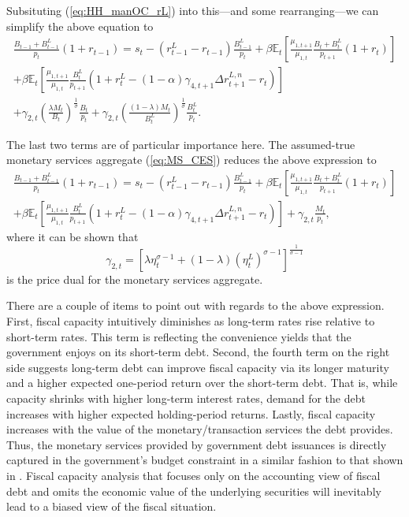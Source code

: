 \documentclass[11pt,a4paper,margin=1.5in]{article}
\begin{document}
Subsituting (\ref{eq:HH_manOC_rL}) into this---and some rearranging---we can simplify the above equation to
\begin{multline}
	\frac{B_{t-1} + B^L_{t-1}}{p_t}(1+r_{t-1})= s_t - (r_{t-1}^L - r_{t-1})\frac{B^L_{t-1}}{p_t} + \beta\mathbb{E}_t\left[\frac{\mu_{1,t+1}}{\mu_{1,t}} \frac{B_{t} +B^L_{t}}{p_{t+1}}(1+r_{t})\right] \\ 
		+ \beta\mathbb{E}_t\left[\frac{\mu_{1,t+1}}{\mu_{1,t}} \frac{B^L_{t}}{p_{t+1}}(1+r^L_{t} - (1-\alpha)\gamma_{4,t+1}\Delta r^{L,n}_{t+1} - r_t)\right]  \\
		+  \gamma_{2,t}\left(\frac{\lambda M_t}{B_t}\right)^\frac{1}{\sigma}\frac{B_t}{p_t} +\gamma_{2,t}\left(\frac{(1-\lambda) M_t}{B^L_t}\right)^\frac{1}{\sigma}\frac{B^L_t}{p_t}.
\end{multline}

The last two terms are of particular importance here.
The assumed-true monetary services aggregate (\ref{eq:MS_CES}) reduces the above expression to 
\begin{multline}
	\frac{B_{t-1} + B^L_{t-1}}{p_t}(1+r_{t-1})= s_t  - (r_{t-1}^L - r_{t-1})\frac{B^L_{t-1}}{p_t} + \beta\mathbb{E}_t\left[\frac{\mu_{1,t+1}}{\mu_{1,t}} \frac{B_{t} +B^L_{t}}{p_{t+1}}(1+r_{t})\right] \\ 
		+ \beta\mathbb{E}_t\left[\frac{\mu_{1,t+1}}{\mu_{1,t}} \frac{B^L_{t}}{p_{t+1}}(1+r^L_{t} - (1-\alpha)\gamma_{4,t+1}\Delta r^{L,n}_{t+1} - r_t)\right] 
		+  \gamma_{2,t}\frac{M_t}{p_t},
	\label{eq:fiscalcapacity}
\end{multline}
where it can be shown that
\begin{equation}
	\gamma_{2,t} = \left[\lambda \eta_t^{\sigma-1} + (1-\lambda)\left(\eta^L_t\right)^{\sigma-1}\right]^\frac{1}{\sigma-1}
	\label{eq:price_dual}
\end{equation}
is the price dual for the monetary services aggregate. 

There are a couple of items to point out with regards to the above expression.
First, fiscal capacity intuitively diminishes as long-term rates rise relative to short-term rates.
This term is reflecting the convenience yields that the government enjoys on its short-term debt.
Second, the fourth term on the right side suggests long-term debt can improve fiscal capacity via its longer maturity and a higher expected one-period return over the short-term debt. 
That is, while capacity shrinks with higher long-term interest rates, demand for the debt increases with higher expected holding-period returns. 
Lastly, fiscal capacity increases with the value of the monetary/transaction services the debt provides.
Thus, the monetary services provided by government debt issuances is directly captured in the government's budget constraint in a similar fashion to that shown in \citet{Brunnermeier-Merkel-Sannikov:2022}.
Fiscal capacity analysis that focuses only on the accounting view of fiscal debt and omits the economic value of the underlying securities will inevitably lead to a biased view of the fiscal situation.
\end{document}
